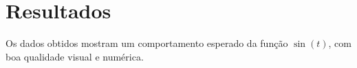 \chapter{Resultados}
Os dados obtidos mostram um comportamento esperado da função $\sin(t)$, com boa qualidade visual e numérica.

